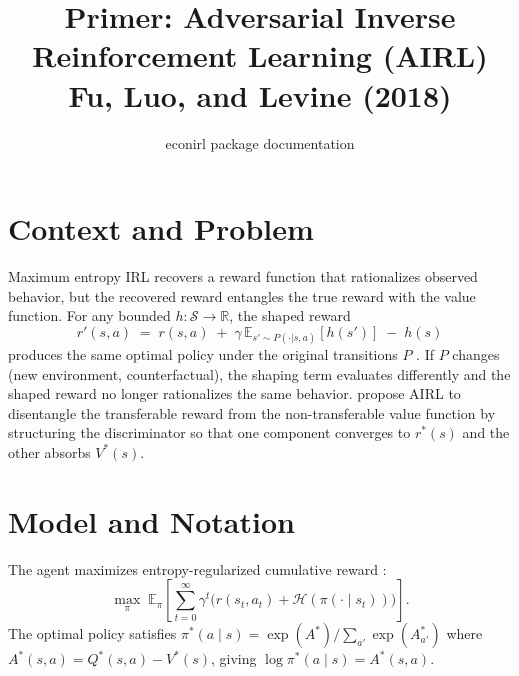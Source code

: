 \documentclass[11pt]{article}
\title{Primer: Adversarial Inverse Reinforcement Learning (AIRL)\\[3pt]
\large Fu, Luo, and Levine (2018)}
\author{econirl package documentation}
\date{}
\newcommand{\E}{\mathbb{E}}
\newcommand{\R}{\mathbb{R}}
\newcommand{\calS}{\mathcal{S}}
\newcommand{\calH}{\mathcal{H}}
\begin{document}
\maketitle
\vspace{-0.5em}

\section{Context and Problem}

Maximum entropy IRL \citep{ziebart2010} recovers a reward function that rationalizes observed behavior, but the recovered reward entangles the true reward with the value function.
For any bounded $h : \calS \to \R$, the shaped reward
\begin{equation}
\label{eq:shaping}
r'(s,a) \;=\; r(s,a) \;+\; \gamma\, \E_{s' \sim P(\cdot|s,a)}[h(s')] \;-\; h(s)
\end{equation}
produces the same optimal policy under the original transitions $P$ \citep{ng1999}.
If $P$ changes (new environment, counterfactual), the shaping term evaluates differently and the shaped reward no longer rationalizes the same behavior.
\citet{fu2018} propose AIRL to disentangle the transferable reward from the non-transferable value function by structuring the discriminator so that one component converges to $r^*(s)$ and the other absorbs $V^*(s)$.

\section{Model and Notation}

The agent maximizes entropy-regularized cumulative reward \citep{ziebart2010}:
\begin{equation}
\label{eq:objective}
\max_\pi \; \E_\pi\!\left[\sum_{t=0}^{\infty} \gamma^t \big(r(s_t, a_t) + \calH(\pi(\cdot \mid s_t))\big)\right].
\end{equation}
The optimal policy satisfies $\pi^*(a \mid s) = \exp(A^*) / \sum_{a'} \exp(A^*_{a'})$ where $A^*(s,a) = Q^*(s,a) - V^*(s)$, giving $\log \pi^*(a \mid s) = A^*(s,a)$.
\end{document}
